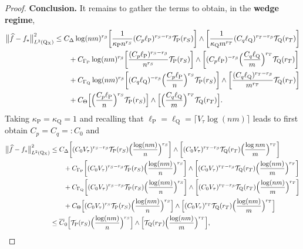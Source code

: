 \documentclass[10pt]{article}
\newcommand{\mT}{\mathcal{T}}
\renewcommand{\P}{\operatorname{P}}
\newcommand{\Q}{\operatorname{Q}}
\renewcommand{\k}{\kappa}
\newcommand{\wh}{\widehat}
\newcommand{\ol}{\overline}
\newcommand{\sX}{\mathrm{X}}
\begin{document}
\begin{proof}
    \noindent\textbf{Conclusion.} It remains to gather the terms to obtain, in the \textbf{wedge regime},
    \begin{align*}
        \big\|\wh f - f_*\big\|^2_{L^2(\Q\mathstrut_{\!\sX})} &\leq C_{\Delta}\log(nm)^{r_\beta}\bigg[\frac{1}{\k_{\P}n^{r_S}}(C_p\ell_{\P})^{r_S - r_\beta}\mT_{\P}(r_S)\bigg]\wedge\bigg[\frac{1}{\k_{\Q}m^{r_T}}(C_q\ell_{\Q})^{r_T - r_\beta}\mT_{\Q}(r_T)\bigg]\\
        &\qquad + C_{\Gamma_{\P}}\log(nm)^{r_\beta}\bigg[\frac{(C_p\ell_{\P})^{r_S - r_\beta}}{n^{r_S}}\mT_{\P}(r_S)\bigg] \wedge \bigg[(C_p\ell_{\P})^{-r_\beta}\Big(\frac{C_q\ell_{\Q}}{m}\Big)^{r_T}\mT_{\Q}(r_T)\bigg]\\
        &\qquad + C_{\Gamma_{\Q}}\log(nm)^{r_\beta}\bigg[(C_q\ell_{\Q})^{-r_\beta}\Big(\frac{C_p\ell_{\P}}{n}\Big)^{r_S}\mT_{\P}(r_S)\bigg]\wedge \bigg[\frac{(C_q\ell_{\Q})^{r_T - r_\beta}}{m^{r_T}}\mT_{\Q}(r_T)\bigg]\\
        &\qquad + C_{\Theta}\Big[\Big(\frac{C_p\ell_{\P}}{n}\Big)^{r_S}\mT_{\P}(r_S)\Big]\wedge \Big[\Big(\frac{C_q\ell_{\Q}}{m}\Big)^{r_T}\mT_{\Q}(r_T)\Big].
    \end{align*}
    Taking $\k_{\P} = \k_{\Q} = 1$ and recalling that $\ell_{\P} = \ell_{\Q} = \lceil V_\tau\log(nm)\rceil$ leads to first obtain $C_p = C_q =: C_0$ and
    \begin{align*}
        \big\|\wh f - f_*\big\|^2_{L^2(\Q\mathstrut_{\!\sX})} &\leq C_{\Delta}\bigg[(C_0V_\tau)^{r_S - r_\beta}\mT_{\P}(r_S)\Big(\frac{\log(nm)}{n}\Big)^{r_S}\bigg]\wedge\bigg[(C_0V_\tau)^{r_T - r_\beta}\mT_{\Q}(r_T)\Big(\frac{\log nm}{m}\Big)^{r_T}\bigg]\\
        &\qquad + C_{\Gamma_{\P}}\bigg[(C_0V_\tau)^{r_S - r_\beta}\mT_{\P}(r_S)\Big(\frac{\log (nm)}{n}\Big)^{r_S}\bigg] \wedge \bigg[(C_0V_\tau)^{r_T-r_\beta}\mT_{\Q}(r_T)\Big(\frac{\log(nm)}{m}\Big)^{r_T}\bigg]\\
        &\qquad + C_{\Gamma_{\Q}}\bigg[(C_0V_\tau)^{r_S-r_\beta}\mT_{\P}(r_S)\Big(\frac{\log(nm)}{n}\Big)^{r_S}\bigg]\wedge \bigg[(C_0V_\tau)^{r_T - r_\beta}\mT_{\Q}(r_T)\Big(\frac{\log(nm)}{m}\Big)^{r_T}\bigg]\\
        &\qquad + C_{\Theta}\Big[(C_0V_\tau)^{r_S}\mT_{\P}(r_S)\Big(\frac{\log(nm)}{n}\Big)^{r_S}\Big]\wedge \Big[(C_0V_\tau)^{r_T}\mT_{\Q}(r_T)\Big(\frac{\log(nm)}{m}\Big)^{r_T}\Big]\\
        &\leq \ol C_0\Big[\mT_{\P}(r_S)\Big(\frac{\log(nm)}{n}\Big)^{r_S}\Big]\wedge \Big[\mT_{\Q}(r_T)\Big(\frac{\log(nm)}{m}\Big)^{r_T}\Big],
    \end{align*}

\end{proof}
\end{document}
